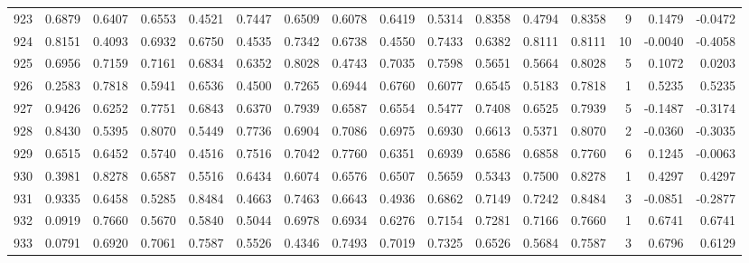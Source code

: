 \begin{tabular}{lrrrrrrrrrrrrrrr}
923 &      0.6879 &  0.6407 &  0.6553 &  0.4521 &  0.7447 &  0.6509 &  0.6078 &  0.6419 &  0.5314 &  0.8358 &   0.4794 &     0.8358 &      9 &                    0.1479 &                    -0.0472 \\
924 &      0.8151 &  0.4093 &  0.6932 &  0.6750 &  0.4535 &  0.7342 &  0.6738 &  0.4550 &  0.7433 &  0.6382 &   0.8111 &     0.8111 &     10 &                   -0.0040 &                    -0.4058 \\
925 &      0.6956 &  0.7159 &  0.7161 &  0.6834 &  0.6352 &  0.8028 &  0.4743 &  0.7035 &  0.7598 &  0.5651 &   0.5664 &     0.8028 &      5 &                    0.1072 &                     0.0203 \\
926 &      0.2583 &  0.7818 &  0.5941 &  0.6536 &  0.4500 &  0.7265 &  0.6944 &  0.6760 &  0.6077 &  0.6545 &   0.5183 &     0.7818 &      1 &                    0.5235 &                     0.5235 \\
927 &      0.9426 &  0.6252 &  0.7751 &  0.6843 &  0.6370 &  0.7939 &  0.6587 &  0.6554 &  0.5477 &  0.7408 &   0.6525 &     0.7939 &      5 &                   -0.1487 &                    -0.3174 \\
928 &      0.8430 &  0.5395 &  0.8070 &  0.5449 &  0.7736 &  0.6904 &  0.7086 &  0.6975 &  0.6930 &  0.6613 &   0.5371 &     0.8070 &      2 &                   -0.0360 &                    -0.3035 \\
929 &      0.6515 &  0.6452 &  0.5740 &  0.4516 &  0.7516 &  0.7042 &  0.7760 &  0.6351 &  0.6939 &  0.6586 &   0.6858 &     0.7760 &      6 &                    0.1245 &                    -0.0063 \\
930 &      0.3981 &  0.8278 &  0.6587 &  0.5516 &  0.6434 &  0.6074 &  0.6576 &  0.6507 &  0.5659 &  0.5343 &   0.7500 &     0.8278 &      1 &                    0.4297 &                     0.4297 \\
931 &      0.9335 &  0.6458 &  0.5285 &  0.8484 &  0.4663 &  0.7463 &  0.6643 &  0.4936 &  0.6862 &  0.7149 &   0.7242 &     0.8484 &      3 &                   -0.0851 &                    -0.2877 \\
932 &      0.0919 &  0.7660 &  0.5670 &  0.5840 &  0.5044 &  0.6978 &  0.6934 &  0.6276 &  0.7154 &  0.7281 &   0.7166 &     0.7660 &      1 &                    0.6741 &                     0.6741 \\
933 &      0.0791 &  0.6920 &  0.7061 &  0.7587 &  0.5526 &  0.4346 &  0.7493 &  0.7019 &  0.7325 &  0.6526 &   0.5684 &     0.7587 &      3 &                    0.6796 &                     0.6129 \\

\end{tabular}
